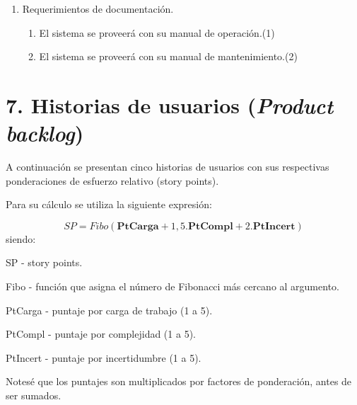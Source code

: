 \documentclass[
11pt, %
codirector, %
]{charter}
\begin{document}
\begin{enumerate}
\item Requerimientos de documentación.
\begin{enumerate}
\item El sistema se proveerá con su manual de operación.(1)
\item El sistema se proveerá con su manual de mantenimiento.(2) 
\end{enumerate}		


\end{enumerate}

\section{7. Historias de usuarios (\textit{Product backlog})}
\label{sec:backlog}

A continuación se presentan cinco historias de usuarios con sus respectivas ponderaciones de esfuerzo relativo (story points).

Para su cálculo se utiliza la siguiente expresión:

\begin{equation}
SP = Fibo (\textbf{PtCarga} + 1,5.\textbf{PtCompl} + 2.\textbf{PtIncert})
\end{equation}
siendo:

SP - story points.

Fibo - función que asigna el número de Fibonacci más cercano al argumento.

PtCarga - puntaje por carga de trabajo (1 a 5).

PtCompl - puntaje por complejidad (1 a 5).

PtIncert - puntaje por incertidumbre (1 a 5).

Notesé que los puntajes son multiplicados por factores de ponderación, antes de ser sumados.
\end{document}
